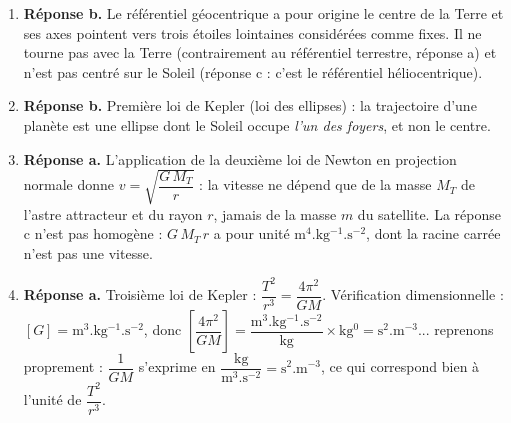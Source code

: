 \documentclass[11pt]{article}
\begin{document}
\begin{corrige}
\begin{enumerate}
\item \textbf{Réponse b.} Le référentiel géocentrique a pour origine le centre de la Terre et ses axes pointent vers trois étoiles lointaines considérées comme fixes. Il ne tourne pas avec la Terre (contrairement au référentiel terrestre, réponse a) et n'est pas centré sur le Soleil (réponse c : c'est le référentiel héliocentrique).
\item \textbf{Réponse b.} Première loi de Kepler (loi des ellipses) : la trajectoire d'une planète est une ellipse dont le Soleil occupe \emph{l'un des foyers}, et non le centre.
\item \textbf{Réponse a.} L'application de la deuxième loi de Newton en projection normale donne $v = \sqrt{\dfrac{G\,M_T}{r}}$ : la vitesse ne dépend que de la masse $M_T$ de l'astre attracteur et du rayon $r$, jamais de la masse $m$ du satellite. La réponse c n'est pas homogène : $G\,M_T\,r$ a pour unité $\mathrm{m^4.kg^{-1}.s^{-2}}$, dont la racine carrée n'est pas une vitesse.
\item \textbf{Réponse a.} Troisième loi de Kepler : $\dfrac{T^2}{r^3} = \dfrac{4\pi^2}{GM}$. Vérification dimensionnelle : $[G] = \mathrm{m^3.kg^{-1}.s^{-2}}$, donc $\left[\dfrac{4\pi^2}{GM}\right] = \dfrac{\mathrm{m^3.kg^{-1}.s^{-2}}}{\mathrm{kg}} \times \mathrm{kg^0} = \mathrm{s^2.m^{-3}}$... reprenons proprement : $\dfrac{1}{GM}$ s'exprime en $\dfrac{\mathrm{kg}}{\mathrm{m^3.s^{-2}}} = \mathrm{s^2.m^{-3}}$, ce qui correspond bien à l'unité de $\dfrac{T^2}{r^3}$.
\end{enumerate}
\end{corrige}
\end{document}
